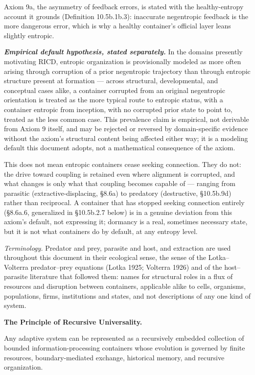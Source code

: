 \documentclass[
]{article}
\begin{document}
Axiom 9a, the asymmetry of feedback errors, is stated with the
healthy-entropy account it grounds (Definition 10.5b.1b.3): inaccurate
negentropic feedback is the more dangerous error, which is why a healthy
container's official layer leans slightly entropic.

\emph{\textbf{Empirical default hypothesis, stated separately.}} In the
domains presently motivating RICD, entropic organization is
provisionally modeled as more often arising through corruption of a
prior negentropic trajectory than through entropic structure present at
formation --- across structural, developmental, and conceptual cases
alike, a container corrupted from an original negentropic orientation is
treated as the more typical route to entropic status, with a container
entropic from inception, with no corrupted prior state to point to,
treated as the less common case. This prevalence claim is empirical, not
derivable from Axiom 9 itself, and may be rejected or reversed by
domain-specific evidence without the axiom's structural content being
affected either way; it is a modeling default this document adopts, not
a mathematical consequence of the axiom.

This does not mean entropic containers cease seeking connection. They do
not: the drive toward coupling is retained even where alignment is
corrupted, and what changes is only what that coupling becomes capable
of --- ranging from parasitic (extractive-displacing, §8.6a) to
predatory (destructive, §10.5b.9d) rather than reciprocal. A container
that has stopped seeking connection entirely (§8.6a.6, generalized in
§10.5b.2.7 below) is in a genuine deviation from this axiom's default,
not expressing it; dormancy is a real, sometimes necessary state, but it
is not what containers do by default, at any entropy level.

\emph{Terminology.} Predator and prey, parasite and host, and extraction
are used throughout this document in their ecological sense, the sense
of the Lotka--Volterra predator--prey equations (Lotka 1925; Volterra
1926) and of the host--parasite literature that followed them: names for
structural roles in a flux of resources and disruption between
containers, applicable alike to cells, organisms, populations, firms,
institutions and states, and not descriptions of any one kind of system.

\textbf{The Principle of Recursive Universality.}

Any adaptive system can be represented as a recursively embedded
collection of bounded information-processing containers whose evolution
is governed by finite resources, boundary-mediated exchange, historical
memory, and recursive organization.
\end{document}

